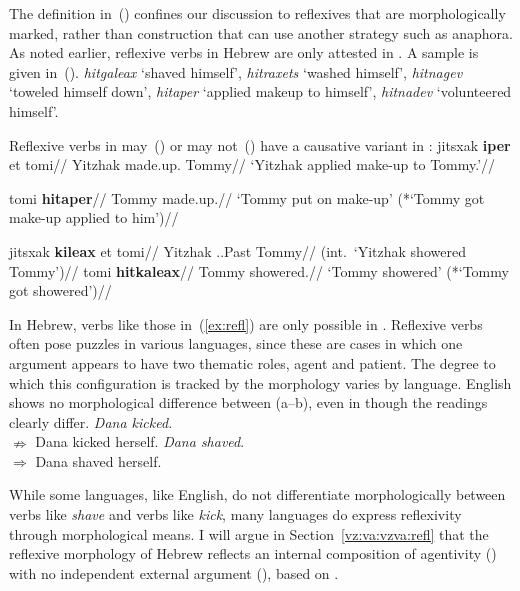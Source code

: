 The definition in~(\lastx) confines our discussion to reflexives that are morphologically marked, rather than construction that can use another strategy such as anaphora. As noted earlier, reflexive verbs in Hebrew are only attested in \thit. A sample is given in~(\nextx).
\ex\label{ex:refl}\emph{hitgaleax} `shaved himself', \emph{hitraxets} `washed himself', \emph{hitnagev} `toweled himself down', \emph{hitaper} `applied makeup to himself', \emph{hitnadev} `volunteered himself'.
\xe

Reflexive verbs in {\thit} may~(\nextx) or may not~(\anextx) have a causative variant in {\tpie}:
\pex\label{ex:vz:refl-va}
	\a \begingl
		\gla jitsxak \textbf{iper} et tomi//
		\glb Yitzhak made.up.  Tommy//
		\glft `Yitzhak applied make-up to Tommy.'//
	\endgl
	
	\a \begingl
		\gla tomi \textbf{hitaper}//
		\glb Tommy made.up.//
		\glft `Tommy put on make-up' (*`Tommy got make-up applied to him')//
	\endgl
\xe

\pex\label{ex:vz:refl-va2}
	\a {} \begingl
		\gla jitsxak \textbf{kileax} et tomi//
		\glb Yitzhak ..Past  Tommy//
		\glft (int.~`Yitzhak showered Tommy')//
	\endgl
	\a \begingl
		\gla tomi \textbf{hitkaleax}//
		\glb Tommy showered.//
		\glft `Tommy showered' (*`Tommy got showered')//
	\endgl
\xe

In Hebrew, verbs like those in~(\ref{ex:refl}) are only possible in {\thit}. Reflexive verbs often pose puzzles in various languages, since these are cases in which one argument appears to have two thematic roles, agent and patient. The degree to which this configuration is tracked by the morphology varies by language. English shows no morphological difference between (\nextx a--b), even in though the readings clearly differ.
\pex \a \emph{Dana kicked.}\\
		$\nRightarrow$ Dana kicked herself.
	\a \emph{Dana shaved}.\\
		$\Rightarrow$ Dana shaved herself.
\xe

While some languages, like English, do not differentiate morphologically between verbs like \emph{shave} and verbs like \emph{kick}, many languages do express reflexivity through morphological means. I will argue in Section~\ref{vz:va:vzva:refl} that the reflexive morphology of Hebrew reflects an internal composition of agentivity (\va) with no independent external argument (\vz), based on \cite{kastner17gjgl}.

